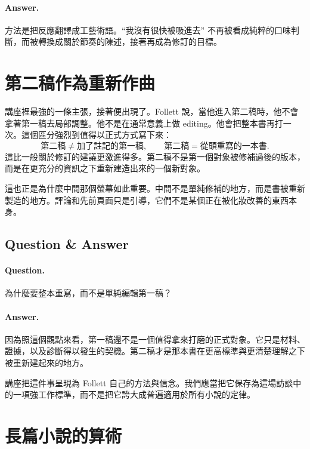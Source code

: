 \paragraph{Answer.} 方法是把反應翻譯成工藝術語。``我沒有很快被吸進去'' 不再被看成純粹的口味判斷，而被轉換成關於節奏的陳述，接著再成為修訂的目標。

\section{第二稿作為重新作曲}

講座裡最強的一條主張，接著便出現了。Follett 說，當他進入第二稿時，他不會拿著第一稿去局部調整。他不是在通常意義上做 editing。他會把整本書再打一次。這個區分強烈到值得以正式方式寫下來：
\begin{equation}
\text{第二稿} \neq \text{加了註記的第一稿}, \qquad
\text{第二稿} = \text{從頭重寫的一本書}.
\end{equation}
這比一般關於修訂的建議更激進得多。第二稿不是第一個對象被修補過後的版本，而是在更充分的資訊之下重新建造出來的一個新對象。

這也正是為什麼中間那個螢幕如此重要。中間不是單純修補的地方，而是書被重新製造的地方。評論和先前頁面只是引導，它們不是某個正在被化妝改善的東西本身。

\subsection{Question \& Answer}

\paragraph{Question.} 為什麼要整本重寫，而不是單純編輯第一稿？

\paragraph{Answer.} 因為照這個觀點來看，第一稿還不是一個值得拿來打磨的正式對象。它只是材料、證據，以及診斷得以發生的契機。第二稿才是那本書在更高標準與更清楚理解之下被重新建起來的地方。

\begin{remark}
講座把這件事呈現為 Follett 自己的方法與信念。我們應當把它保存為這場訪談中的一項強工作標準，而不是把它誇大成普遍適用於所有小說的定律。
\end{remark}

\section{長篇小說的算術}

